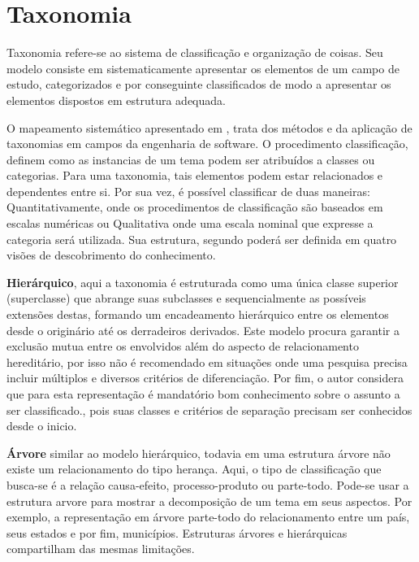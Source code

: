 \section{Taxonomia}
\label{cap2:taxonomia}

Taxonomia refere-se ao sistema de classificação e organização de coisas. Seu modelo consiste em sistematicamente apresentar os elementos de um campo de estudo, categorizados e por conseguinte classificados de modo a apresentar os elementos dispostos em estrutura adequada.

O mapeamento sistemático apresentado em \cite{usman_taxonomies_2017}, trata dos métodos e da aplicação de taxonomias em campos da engenharia de software. O procedimento classificação, definem como as instancias de um tema podem ser atribuídos a classes ou categorias. Para uma taxonomia, tais elementos podem estar relacionados e dependentes entre si. Por sua vez, é possível classificar de duas maneiras: Quantitativamente, onde os procedimentos de classificação são baseados em escalas numéricas ou Qualitativa onde uma escala nominal que expresse a categoria será utilizada. Sua estrutura, segundo \cite{kwasnik_role_nodate} poderá ser definida em quatro visões de descobrimento do conhecimento.

\textbf{Hierárquico}, aqui a taxonomia é estruturada como uma única classe superior (superclasse) que abrange suas subclasses e sequencialmente as possíveis extensões destas, formando um encadeamento hierárquico entre os elementos desde o originário até os derradeiros derivados. Este modelo procura garantir a exclusão mutua entre os envolvidos além do aspecto de relacionamento hereditário, por isso não é recomendado em situações onde uma pesquisa precisa incluir múltiplos e diversos critérios de diferenciação. Por fim, o autor considera que para esta representação é mandatório bom conhecimento sobre o assunto a ser classificado., pois suas classes e critérios de separação precisam ser conhecidos desde o inicio.

\textbf{Árvore} similar ao modelo hierárquico, todavia em uma estrutura árvore não existe um relacionamento do tipo herança. Aqui, o tipo de classificação que busca-se é a relação causa-efeito, processo-produto ou parte-todo. Pode-se usar a estrutura arvore para mostrar a decomposição de um tema em seus aspectos. Por exemplo, a representação em árvore parte-todo do relacionamento entre um país, seus estados e por fim, municípios. Estruturas árvores e hierárquicas compartilham das mesmas limitações.

